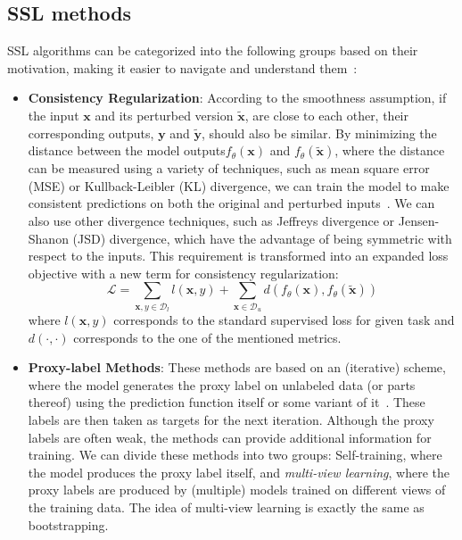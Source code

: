\subsection{SSL methods}
SSL algorithms can be categorized into the following groups based on their motivation, making it easier to navigate and understand them~\cite{ssl-overview-2020}:
\begin{itemize}
    \item \textbf{Consistency Regularization}: According to the smoothness assumption, if the input $\mathbf{x}$ and its perturbed version $\tilde{\mathbf{x}}$, 
    are close to each other, their corresponding outputs, $\mathbf{y}$ and $\tilde{\mathbf{y}}$, should also be similar. By minimizing the 
    distance between the model outputs$f_\theta(\mathbf{x})$ and $f_\theta(\tilde{\mathbf{x}})$, where the distance can be measured using 
    a variety of techniques, such as mean square error (MSE) or Kullback-Leibler (KL) divergence, we can train the model to make consistent
    predictions on both the original and perturbed inputs~\cite{temporal-ensembling-2017,regularization-&-pertrubations-2016}.
    We can also use other divergence techniques, such as Jeffreys divergence or Jensen-Shanon (JSD) divergence, which have the advantage of 
    being symmetric with respect to the inputs. This requirement is transformed into an expanded loss objective with a new term for consistency regularization:
    $$
    \mathcal{L} = \sum_{\mathbf{x},y \in \mathcal{D}_l}l(\mathbf{x},y) + \sum_{\mathbf{x} \in \mathcal{D}_u} d(f_\theta(\mathbf{x}),f_\theta(\tilde{\mathbf{x}}))
    $$
    where $l(\mathbf{x},y)$ corresponds to the standard supervised loss for given task and $d(\cdot,\cdot)$ corresponds to the one of the mentioned metrics. 
    
    \item \textbf{Proxy-label Methods}: These methods are based on an (iterative) scheme, where the model generates the proxy label on unlabeled data (or parts 
        thereof) using the prediction function itself or some variant of it~\cite{psuedo-label-2013}. These labels are then taken as targets for the next iteration.
        Although the proxy labels are often weak, the methods can provide additional information for training. We can divide these methods into two groups: 
        Self-training, where the model produces the proxy label itself, and \textit{multi-view learning}, where the proxy labels are produced by (multiple) models
        trained on different views of the training data. The idea of multi-view learning is exactly the same as bootstrapping.


\end{itemize}
